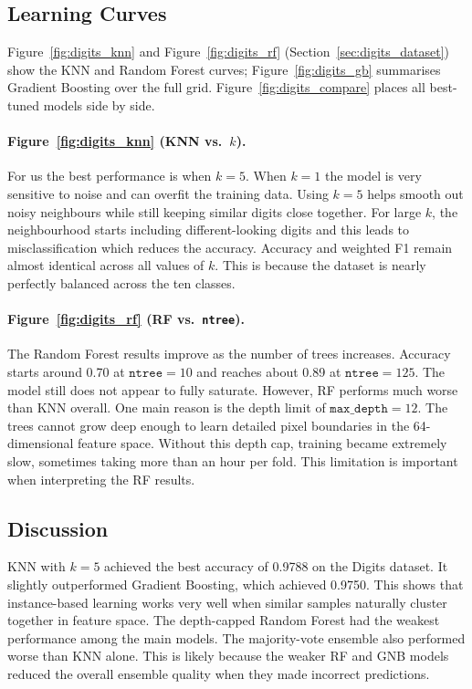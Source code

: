 \documentclass[11pt,letterpaper]{article}
\begin{document}
\subsection{Learning Curves}

Figure~\ref{fig:digits_knn} and Figure~\ref{fig:digits_rf} (Section~\ref{sec:digits_dataset}) show the KNN and Random Forest curves; Figure~\ref{fig:digits_gb} summarises Gradient Boosting over the full grid. Figure~\ref{fig:digits_compare} places all best-tuned models side by side.

\paragraph{Figure~\ref{fig:digits_knn} (KNN vs.\ $k$).}
For us the best performance is when $k=5$. When $k=1$ the model is very
sensitive to noise and can overfit the training data. Using $k=5$ helps
smooth out noisy neighbours while still keeping similar digits close
together. For large $k$, the neighbourhood starts including
different-looking digits and this leads to misclassification which reduces the accuracy. Accuracy and
weighted F1 remain almost identical across all values of $k$. This is
because the dataset is nearly perfectly balanced across the ten classes.

\paragraph{Figure~\ref{fig:digits_rf} (RF vs.\ \texttt{ntree}).}
The Random Forest results improve as the number of trees increases. Accuracy
starts around 0.70 at $\texttt{ntree}=10$ and reaches about 0.89 at
$\texttt{ntree}=125$. The model still does not appear to fully saturate.
However, RF performs much worse than KNN overall. One main reason is the
depth limit of $\texttt{max\_depth}=12$. The trees cannot grow deep enough
to learn detailed pixel boundaries in the 64-dimensional feature space.
Without this depth cap, training became extremely slow, sometimes taking
more than an hour per fold. This limitation is important when interpreting
the RF results.

\subsection{Discussion}

KNN with $k=5$ achieved the best accuracy of 0.9788 on the Digits dataset.
It slightly outperformed Gradient Boosting, which achieved 0.9750. This
shows that instance-based learning works very well when similar samples
naturally cluster together in feature space. The depth-capped Random Forest
had the weakest performance among the main models. The majority-vote
ensemble also performed worse than KNN alone. This is likely because the
weaker RF and GNB models reduced the overall ensemble quality when they
made incorrect predictions.
\end{document}
